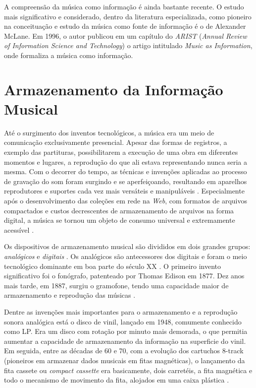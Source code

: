 A compreensão da música como informação é ainda bastante recente. O estudo mais significativo e considerado, dentro da literatura especializada, como pioneiro na conceituação e estudo da música como fonte de informação é o de Alexander McLane. Em 1996, o autor publicou em um capítulo do \textit{ARIST} (\textit{Annual Review of Information Science and Technology}) o artigo intitulado \textit{Music as Information}, onde formaliza a música como informação.

\section{Armazenamento da Informação Musical} \label{sec:armazenamento}

Até o surgimento dos inventos tecnológicos, a música era um meio de comunicação exclusivamente presencial. Apesar das formas de registros, a exemplo das partituras, possibilitarem a execução de uma obra em diferentes momentos e lugares, a reprodução do que ali estava representando nunca seria a mesma. Com o decorrer do tempo,  as técnicas e invenções aplicadas ao processo de gravação do som foram surgindo e se aperfeiçoando, resultando em aparelhos reprodutores e suportes cada vez mais versáteis e manipuláveis \cite{daquino2012}. Especialmente após o desenvolvimento das coleções em rede na \textit{Web}, com formatos de arquivos compactados e custos decrescentes de armazenamento de arquivos na forma digital, a música se tornou um objeto de consumo universal e extremamente acessível \cite{gomes2015}.

Os dispositivos de armazenamento musical são divididos em dois grandes grupos: \textit{analógicos} e \textit{digitais} \cite{andrade&crispim2008}. Os analógicos são antecessores dos digitais e foram o meio tecnológico dominante em boa parte do século XX \cite{paulozuben2004}. O primeiro invento significativo foi o fonógrafo, patenteado por Thomas Edison em 1877. Dez anos mais tarde, em 1887, surgiu o gramofone, tendo uma capacidade maior de armazenamento e reprodução das músicas \cite{marchi2005}. 

Dentre as invenções mais importantes para o armazenamento e a reprodução sonora analógica está o disco de vinil, lançado em 1948, comumente conhecido como LP. Era um disco com rotação por minuto mais demorada, o que permitia aumentar a capacidade de armazenamento da informação na superficie do vinil. Em seguida, entre as décadas de 60 e 70, com a evolução dos cartuchos 8-track (pioneiros em armazenar dados musicais em fitas magnéticas), o lançamento da fita cassete ou \textit{compact cassette} \cite{marchi2005} era basicamente, dois carretéis, a fita magnética e todo o mecanismo de movimento da fita, alojados em uma caixa plástica \cite{andrade&crispim2008}.

